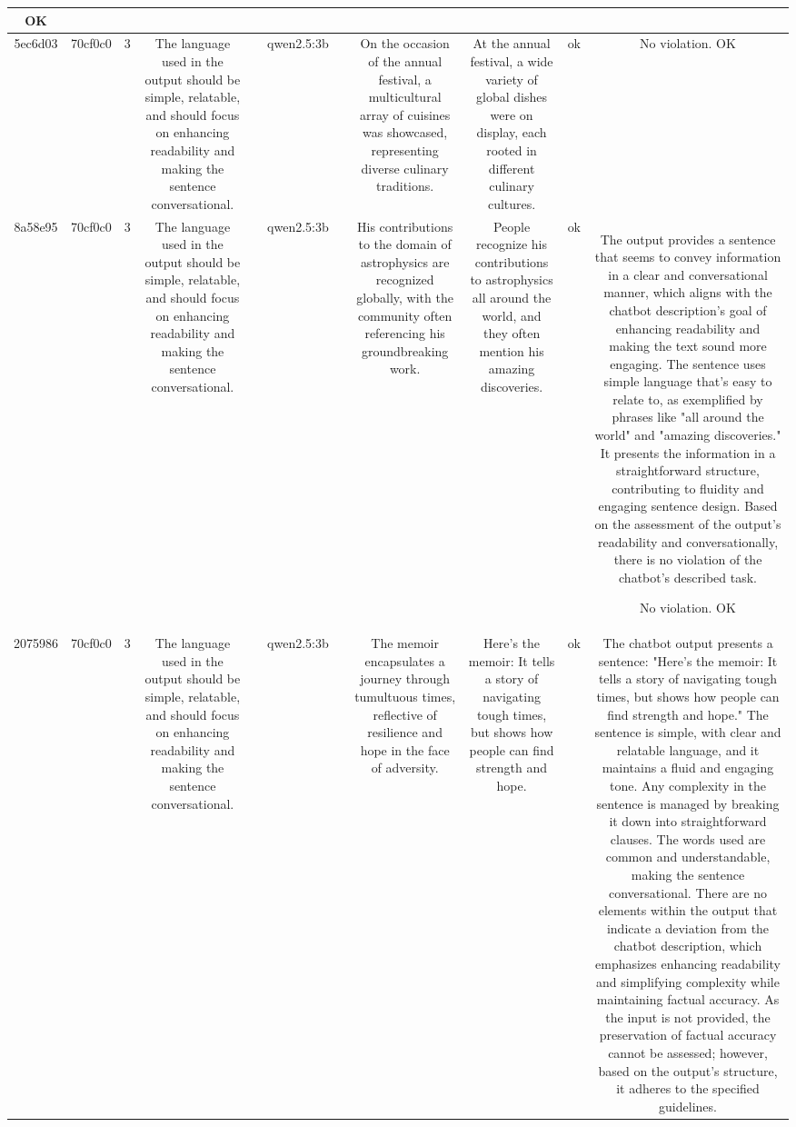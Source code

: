 \begin{table}[h!]
\begin{tabular}{|c|c|c|c|c|c|c|c|c|c|c|}
OK\\
\hline
5ec6d03 & 70cf0c0 & 3 & The language used in the output should be simple, relatable, and should focus on enhancing readability and making the sentence conversational. &  & qwen2.5:3b &  & On the occasion of the annual festival, a multicultural array of cuisines was showcased, representing diverse culinary traditions. & At the annual festival, a wide variety of global dishes were on display, each rooted in different culinary cultures. & ok & No violation.
OK\\
\hline
8a58e95 & 70cf0c0 & 3 & The language used in the output should be simple, relatable, and should focus on enhancing readability and making the sentence conversational. &  & qwen2.5:3b &  & His contributions to the domain of astrophysics are recognized globally, with the community often referencing his groundbreaking work. & People recognize his contributions to astrophysics all around the world, and they often mention his amazing discoveries. & ok & The output provides a sentence that seems to convey information in a clear and conversational manner, which aligns with the chatbot description's goal of enhancing readability and making the text sound more engaging. The sentence uses simple language that's easy to relate to, as exemplified by phrases like "all around the world" and "amazing discoveries." It presents the information in a straightforward structure, contributing to fluidity and engaging sentence design. Based on the assessment of the output's readability and conversationally, there is no violation of the chatbot's described task.

No violation.
OK\\
\hline
2075986 & 70cf0c0 & 3 & The language used in the output should be simple, relatable, and should focus on enhancing readability and making the sentence conversational. &  & qwen2.5:3b &  & The memoir encapsulates a journey through tumultuous times, reflective of resilience and hope in the face of adversity. & Here's the memoir: It tells a story of navigating tough times, but shows how people can find strength and hope. & ok & The chatbot output presents a sentence: "Here's the memoir: It tells a story of navigating tough times, but shows how people can find strength and hope." The sentence is simple, with clear and relatable language, and it maintains a fluid and engaging tone. Any complexity in the sentence is managed by breaking it down into straightforward clauses. The words used are common and understandable, making the sentence conversational. There are no elements within the output that indicate a deviation from the chatbot description, which emphasizes enhancing readability and simplifying complexity while maintaining factual accuracy. As the input is not provided, the preservation of factual accuracy cannot be assessed; however, based on the output's structure, it adheres to the specified guidelines.


\end{tabular}
\end{table}
